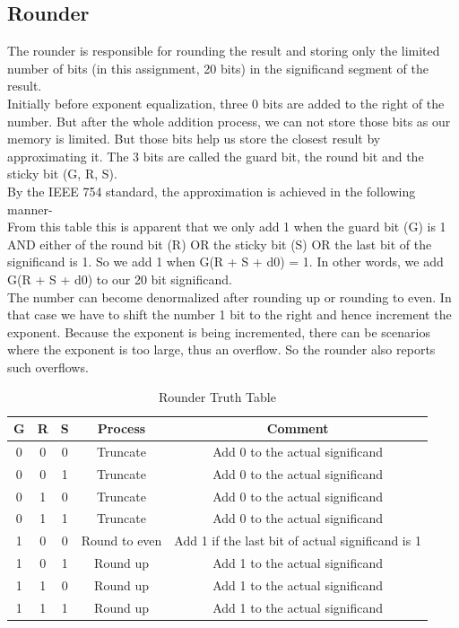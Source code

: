 \documentclass{article}
\begin{document}
\subsection{\textbf{Rounder}}
The rounder is responsible for rounding the result and storing only the limited
number of bits (in this assignment, 20 bits) in the significand segment of the
result.
\\
Initially before exponent equalization, three 0 bits are added to the right of the
number. But after the whole addition process, we can not store those bits as
our memory is limited. But those bits help us store the closest result by approximating it. The 3 bits are called the guard bit, the round bit and the sticky
bit (G, R, S).
\\

By the IEEE 754 standard, the approximation is achieved in the following
manner-
\\ 

From this table this is apparent that we only add 1 when the guard bit (G)
is 1 AND either of the round bit (R) OR the sticky bit (S) OR the last bit of
the significand is 1. So we add 1 when G(R + S + d0) = 1. In other words, we
add G(R + S + d0) to our 20 bit significand.
\\ 

The number can become denormalized after rounding up or rounding to
even. In that case we have to shift the number 1 bit to the right and hence
increment the exponent. Because the exponent is being incremented, there can
be scenarios where the exponent is too large, thus an overflow. So the rounder
also reports such overflows.
\begin{table}[h!]
    \centering
    \begin{tabular}{|c|c|c|c|c|}
        \hline
        \textbf{G} & \textbf{R} & \textbf{S} & \textbf{Process} & \textbf{Comment} \\
        \hline
        0 & 0 & 0 & Truncate       & Add 0 to the actual significand \\
        \hline
        0 & 0 & 1 & Truncate       & Add 0 to the actual significand \\
        \hline
        0 & 1 & 0 & Truncate       & Add 0 to the actual significand \\
        \hline
        0 & 1 & 1 & Truncate       & Add 0 to the actual significand \\
        \hline
        1 & 0 & 0 & Round to even  & Add 1 if the last bit of actual significand is 1 \\
        \hline
        1 & 0 & 1 & Round up       & Add 1 to the actual significand \\
        \hline
        1 & 1 & 0 & Round up       & Add 1 to the actual significand \\
        \hline
        1 & 1 & 1 & Round up       & Add 1 to the actual significand \\
        \hline
    \end{tabular}
    \caption{Rounder Truth Table}
    \label{table:rounder-truth-table}
\end{table}
\end{document}
